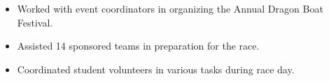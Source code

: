\documentclass[10pt,letter]{altacv}
\begin{document}

\divider



\begin{itemize}
  \item Worked with event coordinators in organizing the Annual Dragon Boat Festival.
  \item Assisted 14 sponsored teams in preparation for the race.
  \item Coordinated student volunteers in various tasks during race day.
\end{itemize}



\clearpage
\end{document}
